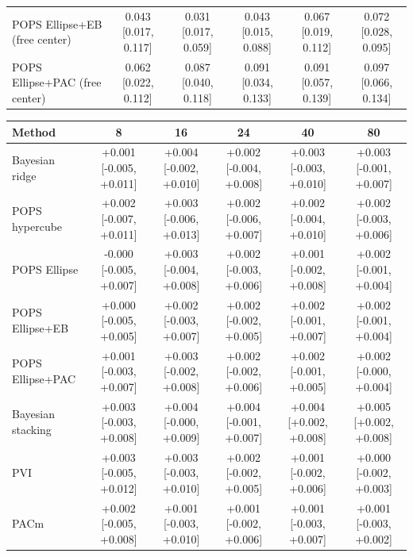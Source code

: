 \begin{tabular}{lccccc}
POPS Ellipse+EB (free center) & 0.043 {\scriptsize[0.017, 0.117]} & 0.031 {\scriptsize[0.017, 0.059]} & 0.043 {\scriptsize[0.015, 0.088]} & 0.067 {\scriptsize[0.019, 0.112]} & 0.072 {\scriptsize[0.028, 0.095]} \\
POPS Ellipse+PAC (free center) & 0.062 {\scriptsize[0.022, 0.112]} & 0.087 {\scriptsize[0.040, 0.118]} & 0.091 {\scriptsize[0.034, 0.133]} & 0.091 {\scriptsize[0.057, 0.139]} & 0.097 {\scriptsize[0.066, 0.134]} \\
\bottomrule
\end{tabular}

\begin{tabular}{lccccc}
\toprule
Method & 8 & 16 & 24 & 40 & 80 \\
\midrule
Bayesian ridge & +0.001 {\scriptsize[-0.005, +0.011]} & +0.004 {\scriptsize[-0.002, +0.010]} & +0.002 {\scriptsize[-0.004, +0.008]} & +0.003 {\scriptsize[-0.003, +0.010]} & +0.003 {\scriptsize[-0.001, +0.007]} \\
POPS hypercube & +0.002 {\scriptsize[-0.007, +0.011]} & +0.003 {\scriptsize[-0.006, +0.013]} & +0.002 {\scriptsize[-0.006, +0.007]} & +0.002 {\scriptsize[-0.004, +0.010]} & +0.002 {\scriptsize[-0.003, +0.006]} \\
POPS Ellipse & -0.000 {\scriptsize[-0.005, +0.007]} & +0.003 {\scriptsize[-0.004, +0.008]} & +0.002 {\scriptsize[-0.003, +0.006]} & +0.001 {\scriptsize[-0.002, +0.008]} & +0.002 {\scriptsize[-0.001, +0.004]} \\
POPS Ellipse+EB & +0.000 {\scriptsize[-0.005, +0.005]} & +0.002 {\scriptsize[-0.003, +0.007]} & +0.002 {\scriptsize[-0.002, +0.005]} & +0.002 {\scriptsize[-0.001, +0.007]} & +0.002 {\scriptsize[-0.001, +0.004]} \\
POPS Ellipse+PAC & +0.001 {\scriptsize[-0.003, +0.007]} & +0.003 {\scriptsize[-0.002, +0.008]} & +0.002 {\scriptsize[-0.002, +0.006]} & +0.002 {\scriptsize[-0.001, +0.005]} & +0.002 {\scriptsize[-0.000, +0.004]} \\
Bayesian stacking & +0.003 {\scriptsize[-0.003, +0.008]} & +0.004 {\scriptsize[-0.000, +0.009]} & +0.004 {\scriptsize[-0.001, +0.007]} & +0.004 {\scriptsize[+0.002, +0.008]} & +0.005 {\scriptsize[+0.002, +0.008]} \\
PVI & +0.003 {\scriptsize[-0.005, +0.012]} & +0.003 {\scriptsize[-0.003, +0.010]} & +0.002 {\scriptsize[-0.002, +0.005]} & +0.001 {\scriptsize[-0.002, +0.006]} & +0.000 {\scriptsize[-0.002, +0.003]} \\
PACm & +0.002 {\scriptsize[-0.005, +0.008]} & +0.001 {\scriptsize[-0.003, +0.010]} & +0.001 {\scriptsize[-0.002, +0.006]} & +0.001 {\scriptsize[-0.003, +0.007]} & +0.001 {\scriptsize[-0.003, +0.002]} \\

\end{tabular}
